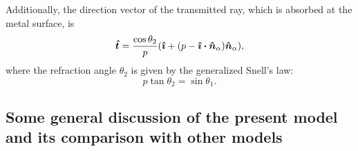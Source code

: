 \documentclass[final]{elsarticle} %
\newcommand{\bn}{\vu*{n}}
\newcommand{\bi}{\vu*{\imath}}
\newcommand{\bt}{\vu*{t}}
\begin{document}
Additionally, the direction vector of the transmitted ray, which is absorbed at the metal surface, is
\begin{equation}\label{eq:refraction}
    \bt = \frac{\cos\theta_2}{p}(\bi + (p - \bi\vdot\bn_\alpha)\bn_\alpha),
\end{equation}
where the refraction angle $\theta_2$ is given by the generalized Snell's law:
\begin{equation}\label{eq:Snell}
    p\tan\theta_2 = \sin\theta_1.
\end{equation}


\subsection{Some general discussion of the present model and its comparison with other models}
\end{document}
